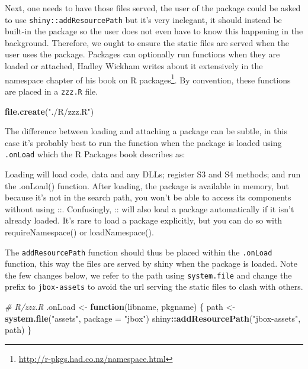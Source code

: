 \documentclass[
]{krantz}
\makeatletter
\newenvironment{Shaded}{\begin{snugshade}}{\end{snugshade}}
\newcommand{\CommentTok}[1]{\textcolor[rgb]{0.37,0.37,0.37}{\textit{#1}}}
\newcommand{\ControlFlowTok}[1]{\textcolor[rgb]{0.27,0.27,0.27}{\textbf{#1}}}
\newcommand{\DataTypeTok}[1]{\textcolor[rgb]{0.27,0.27,0.27}{#1}}
\newcommand{\KeywordTok}[1]{\textcolor[rgb]{0.27,0.27,0.27}{\textbf{#1}}}
\newcommand{\NormalTok}[1]{#1}
\newcommand{\OperatorTok}[1]{\textcolor[rgb]{0.43,0.43,0.43}{\textbf{#1}}}
\newcommand{\StringTok}[1]{\textcolor[rgb]{0.5,0.5,0.5}{#1}}
\renewenvironment{quote}{\begin{VF}}{\end{VF}}
\renewcommand{\href}[2]{#2\footnote{\url{#1}}}
\newenvironment{kframe}{%
\medskip{}
\setlength{\fboxsep}{.8em}
 \def\at@end@of@kframe{}%
 \ifinner\ifhmode%
  \def\at@end@of@kframe{\end{minipage}}%
  \begin{minipage}{\columnwidth}%
 \fi\fi%
 \def\FrameCommand##1{\hskip\@totalleftmargin \hskip-\fboxsep
 \colorbox{shadecolor}{##1}\hskip-\fboxsep
     \hskip-\linewidth \hskip-\@totalleftmargin \hskip\columnwidth}%
 \MakeFramed {\advance\hsize-\width
   \@totalleftmargin\z@ \linewidth\hsize
   \@setminipage}}%
 {\par\unskip\endMakeFramed%
 \at@end@of@kframe}
\renewenvironment{Shaded}{\begin{kframe}}{\end{kframe}}
\makeatother
\begin{document}
Next, one needs to have those files served, the user of the package could be asked to use \texttt{shiny::addResourcePath} but it's very inelegant, it should instead be built-in the package so the user does not even have to know this happening in the background. Therefore, we ought to ensure the static files are served when the user uses the package. Packages can optionally run functions when they are loaded or attached, Hadley Wickham writes about it extensively in the namespace chapter of his book on \href{http://r-pkgs.had.co.nz/namespace.html}{R packages}. By convention, these functions are placed in a \texttt{zzz.R} file.

\begin{Shaded}
\begin{Highlighting}[]
\KeywordTok{file.create}\NormalTok{(}\StringTok{"./R/zzz.R"}\NormalTok{)}
\end{Highlighting}
\end{Shaded}

The difference between loading and attaching a package can be subtle, in this case it's probably best to run the function when the package is loaded using \texttt{.onLoad} which the R Packages book describes as:

\begin{quote}
Loading will load code, data and any DLLs; register S3 and S4 methods; and run the .onLoad() function. After loading, the package is available in memory, but because it's not in the search path, you won't be able to access its components without using ::. Confusingly, :: will also load a package automatically if it isn't already loaded. It's rare to load a package explicitly, but you can do so with requireNamespace() or loadNamespace().

\end{quote}

The \texttt{addResourcePath} function should thus be placed within the \texttt{.onLoad} function, this way the files are served by shiny when the package is loaded. Note the few changes below, we refer to the path using \texttt{system.file} and change the prefix to \texttt{jbox-assets} to avoid the url serving the static files to clash with others.

\begin{Shaded}
\begin{Highlighting}[]
\CommentTok{\# R/zzz.R}
\NormalTok{.onLoad <{-}}\StringTok{ }\ControlFlowTok{function}\NormalTok{(libname, pkgname) \{}
\NormalTok{  path <{-}}\StringTok{ }\KeywordTok{system.file}\NormalTok{(}\StringTok{"assets"}\NormalTok{, }\DataTypeTok{package =} \StringTok{"jbox"}\NormalTok{)}
\NormalTok{  shiny}\OperatorTok{::}\KeywordTok{addResourcePath}\NormalTok{(}\StringTok{"jbox{-}assets"}\NormalTok{, path)}
\NormalTok{\}}
\end{Highlighting}
\end{Shaded}
\end{document}
